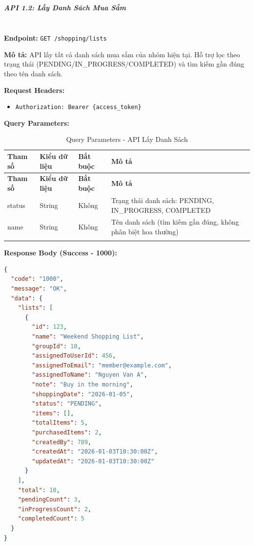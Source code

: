 \normalsize

\subparagraph{API 1.2: Lấy Danh Sách Mua Sắm}~\\

\textbf{Endpoint:} \texttt{GET /shopping/lists}

\textbf{Mô tả:} API lấy tất cả danh sách mua sắm của nhóm hiện tại. Hỗ trợ lọc theo trạng thái (PENDING/IN\_PROGRESS/COMPLETED) và tìm kiếm gần đúng theo tên danh sách.

\textbf{Request Headers:}
\begin{itemize}
    \item \texttt{Authorization: Bearer \{access\_token\}}
\end{itemize}

\textbf{Query Parameters:}

\small
\begin{longtable}{|>{\raggedright\arraybackslash}p{3cm}|>{\raggedright\arraybackslash}p{2.5cm}|>{\raggedright\arraybackslash}p{2cm}|>{\raggedright\arraybackslash}p{6cm}|}
\hline
\textbf{Tham số} & \textbf{Kiểu dữ liệu} & \textbf{Bắt buộc} & \textbf{Mô tả} \\
\hline
\endfirsthead
\hline
\textbf{Tham số} & \textbf{Kiểu dữ liệu} & \textbf{Bắt buộc} & \textbf{Mô tả} \\
\hline
\endhead
status & String & Không & Trạng thái danh sách: PENDING, IN\_PROGRESS, COMPLETED \\
\hline
name & String & Không & Tên danh sách (tìm kiếm gần đúng, không phân biệt hoa thường) \\
\hline
\caption{Query Parameters - API Lấy Danh Sách}
\end{longtable}

\textbf{Response Body (Success - 1000):}

\begin{lstlisting}[language=json, caption=Response thanh cong API 1.2]
{
  "code": "1000",
  "message": "OK",
  "data": {
    "lists": [
      {
        "id": 123,
        "name": "Weekend Shopping List",
        "groupId": 10,
        "assignedToUserId": 456,
        "assignedToEmail": "member@example.com",
        "assignedToName": "Nguyen Van A",
        "note": "Buy in the morning",
        "shoppingDate": "2026-01-05",
        "status": "PENDING",
        "items": [],
        "totalItems": 5,
        "purchasedItems": 2,
        "createdBy": 789,
        "createdAt": "2026-01-03T10:30:00Z",
        "updatedAt": "2026-01-03T10:30:00Z"
      }
    ],
    "total": 10,
    "pendingCount": 3,
    "inProgressCount": 2,
    "completedCount": 5
  }
}
\end{lstlisting}

